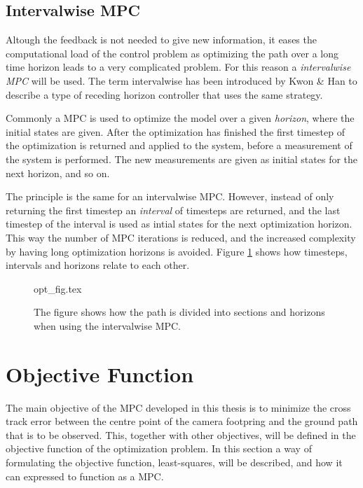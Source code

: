 \subsection{Intervalwise MPC}

Altough the feedback is not needed to give new information, it eases the computational load of the control problem as optimizing the path over a long time horizon leads to a very complicated problem. For this reason a \textit{intervalwise MPC} will be used. The term intervalwise has been introduced by Kwon \& Han \cite{rhcKWON} to describe a type of receding horizon controller that uses the same strategy.

Commonly a MPC is used to optimize the model over a given \textit{horizon}, where the initial states are given. After the optimization has finished the first timestep of the optimization is returned and applied to the system, before a measurement of the system is performed. The new measurements are given as initial states for the next horizon, and so on.

The principle is the same for an intervalwise MPC. However, instead of only returning the first timestep an \textit{interval} of timesteps are returned, and the last timestep of the interval is used as intial states for the next optimization horizon. This way the number of MPC iterations is reduced, and the increased complexity by having long optimization horizons is avoided. Figure \ref{fig:opt_fig} shows how timesteps, intervals and horizons relate to each other.

\begin{figure}
	{opt_fig.tex}
	\caption{The figure shows how the path is divided into sections and horizons when using the intervalwise MPC.}
	\label{fig:opt_fig}
\end{figure}


\section{Objective Function}
\label{ch:objective_function}

The main objective of the MPC developed in this thesis is to minimize the cross track error between the centre point of the camera footpring and the ground path that is to be observed. This, together with other objectives, will be defined in the objective function of the optimization problem. In this section a way of formulating the objective function, least-squares, will be described, and how it can expressed to function as a MPC.



